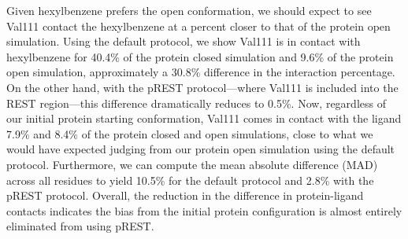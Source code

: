 Given hexylbenzene prefers the open conformation, we should expect to see Val111 contact the hexylbenzene at a percent closer to that of the protein open simulation.
Using the default protocol, we show Val111 is in contact with hexylbenzene for 40.4\% of the protein closed simulation and 9.6\% of the protein open simulation, approximately a 30.8\% difference in the interaction percentage.
On the other hand, with the pREST protocol---where Val111 is included into the REST region---this difference dramatically reduces to 0.5\%.
Now, regardless of our initial protein starting conformation, Val111 comes in contact with the ligand 7.9\% and 8.4\% of the protein closed and open simulations, close to what we would have expected judging from our protein open simulation using the default protocol.
Furthermore, we can compute the mean absolute difference (MAD) across all residues to yield 10.5\% for the default protocol and 2.8\% with the pREST protocol.
Overall, the reduction in the difference in protein-ligand contacts indicates the bias from the initial protein configuration is almost entirely eliminated from using pREST.

